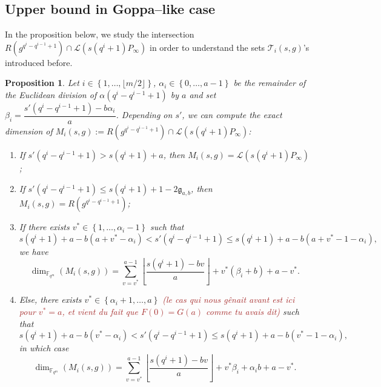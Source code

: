 \documentclass[a4paper]{article}
\newtheorem{proposition}[thm]{Proposition}
\theoremstyle{definition}
\theoremstyle{remark}
\newcommand{\calL}{\mathcal{L}}
\newcommand{\calT}{\mathcal{T}}
\newcommand{\fqm}{\mathbb{F}_{q^m}}
\newcommand{\set}[1]{\left\{#1\right\}}
\newcommand\mathieu[1]{\textcolor{brown}{#1}}
\begin{document}

\subsection{Upper bound in Goppa--like case}

In the proposition below, we study the intersection $R(g^{q^{i}-q^{i-1}+1}) \cap \calL(s(q^i+1)P_\infty)$ in order to understand the sets $\calT_i(s,g)$'s introduced before.


\begin{proposition} \label{prop:dim_M_i's}
Let $i \in \set{1,\dots,\lfloor m/2 \rfloor}$,
     $\alpha_i \in \set{0,\dots,a-1}$ be the remainder of the Euclidean division of $\alpha (q^i-q^{i-1}+1)$ by $a$ and set $\beta_i = \dfrac{s'(q^i-q^{i-1}+1)-b\alpha_i}{a}$. Depending on $s'$, we can compute the exact dimension of $M_i(s,g) := R(g^{q^{i}-q^{i-1}+1}) \cap \calL(s(q^i+1)P_\infty)$:
    
    \begin{enumerate}
        \item If $s'(q^i-q^{i-1}+1) > s(q^i+1)+a$, then $M_i(s,g) = \calL(s(q^i+1)P_\infty)$ ;
        
        \item If $s'(q^i-q^{i-1}+1) \leq s(q^i+1)+1-2\mathfrak{g}_{a,b}$, then $M_i(s,g) = R(g^{q^{i}-q^{i-1}+1})$;
        
        \item If there exists $v^* \in \set{1,\dots,\alpha_i-1}$ such that
        $$ s(q^i+1)+a-b(a+v^*-\alpha_i) < s'(q^i-q^{i-1}+1) \leq  s(q^i+1)+a-b(a+v^*-1-\alpha_i),$$
        we have 
          $$\dim_{\fqm}(M_i(s,g)) = \sum\limits_{v=v^*}^{a-1} \left\lfloor \dfrac{s(q^i+1)-bv}{a} \right\rfloor + v^*(\beta_i+b) + a-v^*.$$
        
        \item Else, there exists $v^* \in \set{\alpha_i+1,\dots,a}$ \mathieu{(le cas qui nous gênait avant est ici pour $v^*=a$, et vient du fait que $F(0)=G(a)$ comme tu avais dit)} such that
        $$ s(q^i+1)+a-b(v^*-\alpha_i) < s'(q^i-q^{i-1}+1) \leq  s(q^i+1)+a-b(v^*-1-\alpha_i),$$
        in which case 
        $$\dim_{\fqm}(M_i(s,g)) = \sum\limits_{v=v^*}^{a-1} \left\lfloor \dfrac{s(q^i+1)-bv}{a} \right\rfloor + v^*\beta_i + \alpha_ib +a-v^*.$$
    \end{enumerate}
\end{proposition}
\end{document}
